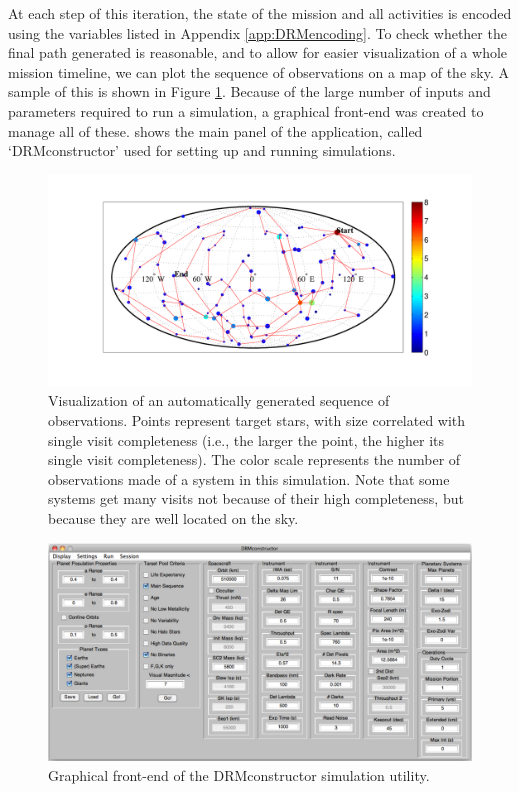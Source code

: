 At each step of this iteration, the state of the mission and all activities is encoded using the variables listed in Appendix \ref{app:DRMencoding}.  To check whether the final path generated is reasonable, and to allow for easier visualization of a whole mission timeline,  we can plot the sequence of observations on a map of the sky.  A sample of this is shown in Figure \ref{fig:theia_DRM}.  Because of the large number of inputs and parameters required to run a simulation, a graphical front-end was created to manage all of these.   shows the main panel of the application, called `DRMconstructor' used for setting up and running simulations. 
%
\begin{figure}[ht]
\centering
   \includegraphics[width = 6in,clip=true,trim=1.2in 0.75in 0.9in 0.5in]{./figures/theia_DRM}
 \caption[Sample auto-generated DRM]{ \label{fig:theia_DRM} Visualization of an automatically generated sequence of observations. Points represent target stars, with size correlated with single visit completeness (i.e., the larger the point, the higher its single visit completeness). The color scale represents the number of observations made of a system in this simulation.  Note that some systems get many visits not because of their high completeness, but because they are well located on the sky.}
 \end{figure}
 \begin{figure}[ht]
\centering
   \includegraphics[width = 6in]{./figures/DRMconstructor}
 \caption[DRMconstructor]{ \label{fig:DRMconstructor} Graphical front-end of the DRMconstructor simulation utility.}
 \end{figure}

